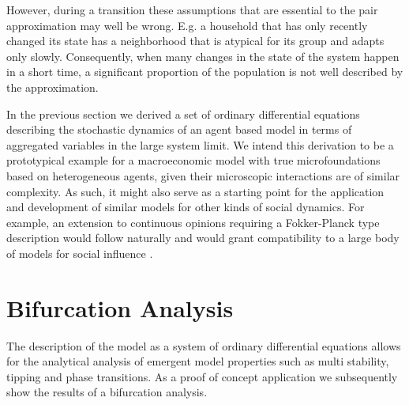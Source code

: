 However, during a transition these assumptions that are essential to the pair approximation may well be wrong. E.g. a household that has only recently changed its state has a neighborhood that is atypical for its group and adapts only slowly. Consequently, when many changes in the state of the system happen in a short time, a significant proportion of the population is not well described by the approximation.

In the previous section we derived a set of ordinary differential equations describing the stochastic dynamics of an agent based model in terms of aggregated variables in the large system limit. We intend this derivation to be a prototypical example for a macroeconomic model with true microfoundations based on heterogeneous agents, given their microscopic interactions are of similar complexity. As such, it might also serve as a starting point for the application and development of similar models for other kinds of social dynamics. For example, an extension to continuous opinions requiring a Fokker-Planck type description would follow naturally and would grant compatibility to a large body of models for social influence \citep[see ref.][pp. 988 f.]{Mueller-Hansen2017}.

\section{Bifurcation Analysis}
\label{sec:bifurcation-analysis}

The description of the model as a system of ordinary differential equations allows for the analytical analysis of emergent model properties such as multi stability, tipping and phase transitions. 
As a proof of concept application we subsequently show the results of a bifurcation analysis.

